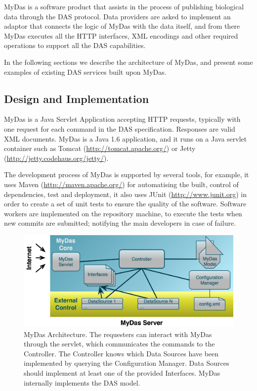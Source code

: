 MyDas is a software product that assists in the process of publishing biological data through the DAS protocol. Data providers are asked to implement an adaptor that connects the logic of MyDas with the data itself, and from there MyDas executes all the HTTP interfaces, XML encodings and other required operations to support all the DAS capabilities.

In the following sections we describe the architecture of MyDas, and present some examples of existing DAS services built upon MyDas.

\subsection{ Design and Implementation}
MyDas is a Java Servlet Application accepting HTTP requests, typically with one request for each command in the DAS specification. Responses are valid XML documents. MyDas is a Java 1.6 application, and it runs on a Java servlet container such as Tomcat (\url{http://tomcat.apache.org/}) or Jetty (\url{http://jetty.codehaus.org/jetty/}). 

The development process of MyDas is supported by several tools, for example, it uses Maven (\url{http://maven.apache.org/}) for automatising the built, control of dependencies, test and deployment, it also uses JUnit (\url{http://www.junit.org}) in order to create a set of unit tests to ensure the quality of the software. Software workers are implemented on the repository machine, to execute the tests when new commits are submitted; notifying the main developers in case of failure.

\begin{figure}[t]
\centering
\includegraphics[width=\textwidth]{figures/MydasArchitecture.png}
\caption[MyDas Architecture.] {MyDas Architecture. The requesters can interact with MyDas through the servlet, which communicates the commands to the Controller. The Controller knows which Data Sources have been implemented by querying the Configuration Manager. Data Sources should implement at least one of the provided Interfaces. MyDas internally implements the DAS model.
\label{fig:mydas}}
\end{figure}

